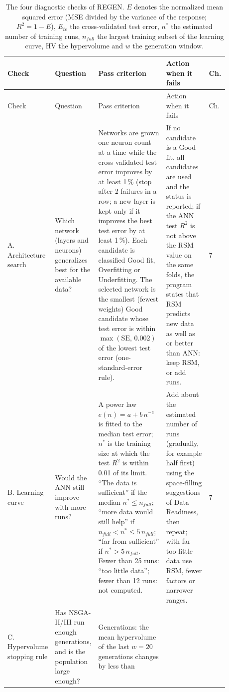 {\footnotesize
\begin{longtable}{@{}p{0.11\linewidth}p{0.16\linewidth}p{0.36\linewidth}p{0.22\linewidth}p{0.03\linewidth}@{}}
\caption{The four diagnostic checks of REGEN. $E$ denotes the normalized mean squared error (MSE divided by the
variance of the response; $R^2 = 1-E$), $E_{te}$ the cross-validated test error, $n^*$ the estimated number of
training runs, $n_{full}$ the largest training subset of the learning curve, HV the hypervolume and $w$ the
generation window.}\label{tab:ch01-checks}\\
\toprule
Check & Question & Pass criterion & Action when it fails & Ch. \\
\midrule
\endfirsthead
\toprule
Check & Question & Pass criterion & Action when it fails & Ch. \\
\midrule
\endhead
\bottomrule
\endfoot
A. Architecture search &
Which network (layers and neurons) generalizes best for the available data? &
Networks are grown one neuron count at a time while the cross-validated test error improves by at least 1\,\%
(stop after 2 failures in a row; a new layer is kept only if it improves the best test error by at least 1\,\%).
Each candidate is classified Good fit, Overfitting or Underfitting. The selected network is the smallest (fewest
weights) Good candidate whose test error is within $\max(\mathrm{SE},\,0.002)$ of the lowest test error
(one-standard-error rule). &
If no candidate is a Good fit, all candidates are used and the status is reported; if the ANN test $R^2$ is not
above the RSM value on the same folds, the program states that RSM predicts new data as well as or better than
ANN: keep RSM, or add runs. & 7 \\
\addlinespace
B. Learning curve &
Would the ANN still improve with more runs? &
A power law $e(n)=a+b\,n^{-c}$ is fitted to the median test error; $n^*$ is the training size at which the test
$R^2$ is within 0.01 of its limit. ``The data is sufficient'' if the median $n^*\le n_{full}$; ``more data would
still help'' if $n_{full}<n^*\le5\,n_{full}$; ``far from sufficient'' if $n^*>5\,n_{full}$. Fewer than 25 runs:
``too little data''; fewer than 12 runs: not computed. &
Add about the estimated number of runs (gradually, for example half first) using the space-filling suggestions of
Data Readiness, then repeat; with far too little data use RSM, fewer factors or narrower ranges. & 7 \\
\addlinespace
C. Hypervolume stopping rule &
Has NSGA-II/III run enough generations, and is the population large enough? &
Generations: the mean hypervolume of the last $w=20$ generations changes by less than

\end{longtable}}
